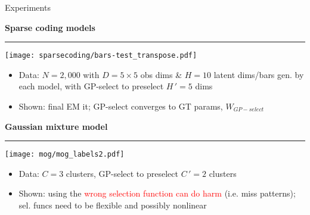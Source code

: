 \documentclass[final]{beamer}
\newcommand{\highlight}[1]{\textcolor{blocktbgn}{#1}}
\newcommand{\subhead}[1]{ \centering \textbf{#1}                                                                                                                                                                 \vskip-1.7\baselineskip~\\
\rule{\linewidth}{1pt}
\vspace{-0.9cm}
}
\begin{document}
\begin{frame}{}
\begin{columns}[t]
  \begin{column}{.32\linewidth}
    \begin{block}{Experiments}

    \vspace{-.5cm}
      \subhead{Sparse coding models}
            \vspace{.25cm}
                \texttt{[image: sparsecoding/bars-test\_transpose.pdf]}\\
            \vspace{.05cm}
           \begin{itemize}
            \item \highlight{Data}: $N=2,000$ with $D=5\times5$ obs dims \& \highlight{$H=10$ latent dims/bars} gen. by each model, with
                \highlight{GP-select} to preselect \highlight{$H\,' = 5$ dims}
            \item \highlight{Shown}: final EM it; GP-select \highlight{converges to GT params}, $W_{GP-select}$ %
          \end{itemize}

\vspace{.2cm}
     \subhead{Gaussian mixture model} 
        \vspace{.15cm}
                \texttt{[image: mog/mog\_labels2.pdf]}\\
           \vspace{.2cm}
           \begin{itemize}
            \item \highlight{Data}: \highlight{$C=3$ clusters}, \highlight{GP-select} to preselect \highlight{$C\,'=2$ clusters}
            \item \highlight{Shown}: using the \textcolor{red}{wrong selection function can do harm} (i.e. miss patterns); sel. funcs need to be \textcolor{dg}{flexible} and possibly \textcolor{dg}{nonlinear}
          \end{itemize}


\end{block}
\end{column}
\end{columns}
\end{frame}
\end{document}

